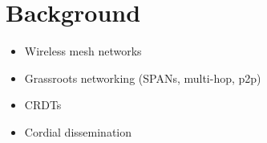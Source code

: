 \section{Background}

\begin{frame}
    \begin{itemize}
        \item Wireless mesh networks
        \item Grassroots networking (SPANs, multi-hop, p2p)
        \item CRDTs
        \item Cordial dissemination
    \end{itemize}
\end{frame}